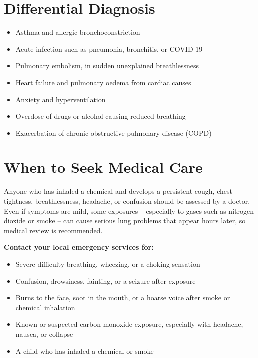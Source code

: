 \section*{Differential Diagnosis}
\begin{itemize}
    \item Asthma and allergic bronchoconstriction
    \item Acute infection such as pneumonia, bronchitis, or COVID-19
    \item Pulmonary embolism, in sudden unexplained breathlessness
    \item Heart failure and pulmonary oedema from cardiac causes
    \item Anxiety and hyperventilation
    \item Overdose of drugs or alcohol causing reduced breathing
    \item Exacerbation of chronic obstructive pulmonary disease (COPD)
\end{itemize}

\section*{When to Seek Medical Care}
Anyone who has inhaled a chemical and develops a persistent cough, chest tightness, breathlessness, headache, or confusion should be assessed by a doctor. Even if symptoms are mild, some exposures -- especially to gases such as nitrogen dioxide or smoke -- can cause serious lung problems that appear hours later, so medical review is recommended.

\medskip
\textbf{Contact your local emergency services for:}
\begin{itemize}
    \item Severe difficulty breathing, wheezing, or a choking sensation
    \item Confusion, drowsiness, fainting, or a seizure after exposure
    \item Burns to the face, soot in the mouth, or a hoarse voice after smoke or chemical inhalation
    \item Known or suspected carbon monoxide exposure, especially with headache, nausea, or collapse
    \item A child who has inhaled a chemical or smoke
\end{itemize}


